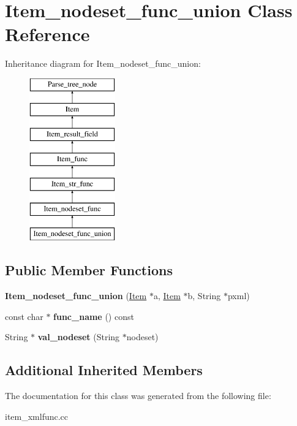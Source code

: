 \hypertarget{classItem__nodeset__func__union}{}\section{Item\+\_\+nodeset\+\_\+func\+\_\+union Class Reference}
\label{classItem__nodeset__func__union}
Inheritance diagram for Item\+\_\+nodeset\+\_\+func\+\_\+union\+:\begin{figure}[H]
\begin{center}
\leavevmode
\includegraphics[height=7.000000cm]{classItem__nodeset__func__union}
\end{center}
\end{figure}
\subsection*{Public Member Functions}
\begin{DoxyCompactItemize}
\item 
\mbox{\label{classItem__nodeset__func__union_ae6d0caae2c341348f0e916167f835e3e}} 
{\bfseries Item\+\_\+nodeset\+\_\+func\+\_\+union} (\mbox{\hyperlink{classItem}{Item}} $\ast$a, \mbox{\hyperlink{classItem}{Item}} $\ast$b, String $\ast$pxml)
\item 
\mbox{\label{classItem__nodeset__func__union_af821408c759c88303e7c454b1ec12ee7}} 
const char $\ast$ {\bfseries func\+\_\+name} () const
\item 
\mbox{\label{classItem__nodeset__func__union_ad5bbb6daf554e0174fe696ceb3e6be5b}} 
String $\ast$ {\bfseries val\+\_\+nodeset} (String $\ast$nodeset)
\end{DoxyCompactItemize}
\subsection*{Additional Inherited Members}


The documentation for this class was generated from the following file\+:\begin{DoxyCompactItemize}
\item 
item\+\_\+xmlfunc.\+cc\end{DoxyCompactItemize}
